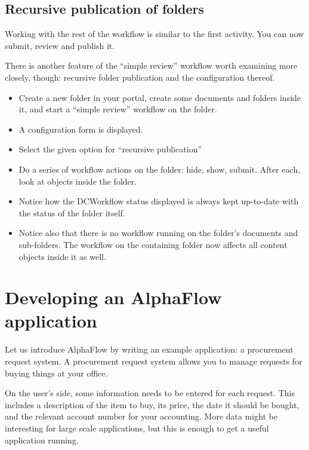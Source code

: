 \subsection{Recursive publication of folders}

Working with the rest of the workflow is similar to the first activity. You can
now submit, review and publish it. 

There is another feature of the ``simple review'' workflow worth examining more
closely, though: recursive folder publication and the configuration thereof.

\begin{itemize}
\item Create a new folder in your portal, create some documents and folders
  inside it, and start a ``simple review'' workflow on the folder.
\item A configuration form is displayed.
\item Select the given option for ``recursive publication''
\item Do a series of workflow actions on the folder: hide, show, submit. After
  each, look at objects inside the folder.
\item Notice how the DCWorkflow status displayed is always kept up-to-date
  with the status of the folder itself.
\item Notice also that there is no workflow running on the folder's documents
  and sub-folders. The workflow on the containing folder now affects all
  content objects inside it as well.
\end{itemize}

\section{Developing an AlphaFlow application}

Let us introduce AlphaFlow by writing an example application: a procurement
request system. A procurement request system allows you to manage
requests for buying things at your office.
    
On the user's side, some information needs to be entered for each request.
This includes a description of the item to buy, its price, the date it should
be bought, and the relevant account number for your accounting. More data
might be interesting for large scale applications, but this is enough to get a
useful application running.

